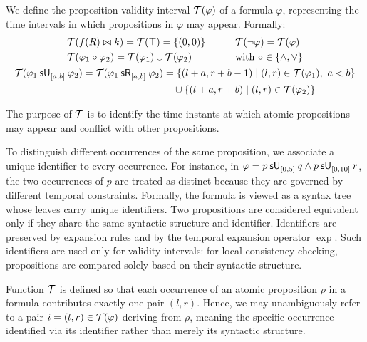 \documentclass{easychair}
\begin{document}
We define the proposition validity interval $\tinv(\varphi)$ of a formula $\varphi$, representing the time intervals in which propositions in $\varphi$ may appear. Formally:
\begin{gather*}
    \begin{aligned}
        &\tinv(f(R) \bowtie k) = \tinv(\top) = \set{(0,0)} &\qquad
        &\tinv(\neg \varphi) = \tinv(\varphi) \\
        &\tinv(\varphi_1 \circ \varphi_2) = \tinv(\varphi_1) \cup \tinv(\varphi_2) &\qquad& \text{with } \circ \in \set{\land, \lor} \\
    \end{aligned} \\
    \begin{aligned}
        \tinv(\suntil{[a,b]}{\varphi_1}{\varphi_2})
        =
        \tinv(\srelease{[a,b]}{\varphi_1}{\varphi_2})
        &=
        \set{(l+a, r+b-1) \mid (l,r) \in \tinv(\varphi_1),\ a < b} \\
        &\quad\cup
        \set{(l+a, r+b) \mid (l,r) \in \tinv(\varphi_2)}
    \end{aligned}
\end{gather*}

The purpose of $\tinv$ is to identify the time instants at which atomic propositions may appear and conflict with other propositions.

To distinguish different occurrences of the same proposition, we associate a unique identifier to every occurrence.
%
For instance, in $\varphi = \suntil{[0,5]}{p}{q} \land \suntil{[0,10]}{p}{r}$, the two occurrences of $p$ are treated as distinct because they are governed by different temporal constraints.
%
Formally, the formula is viewed as a syntax tree whose leaves carry unique identifiers.
%
Two propositions are considered equivalent only if they share the same syntactic structure and identifier.
%
Identifiers are preserved by expansion rules and by the temporal expansion operator $\exp$.
%
Such identifiers are used only for validity intervals: for local consistency checking, propositions are compared solely based on their syntactic structure.

Function $\tinv$ is defined so that each occurrence of an atomic proposition $\rho$ in a formula contributes exactly one pair $(l,r)$. 
%
Hence, we may unambiguously refer to a pair $i = (l,r) \in \tinv(\varphi)$ deriving from $\rho$, meaning the specific occurrence identified via its identifier rather than merely its syntactic structure. 
\end{document}
